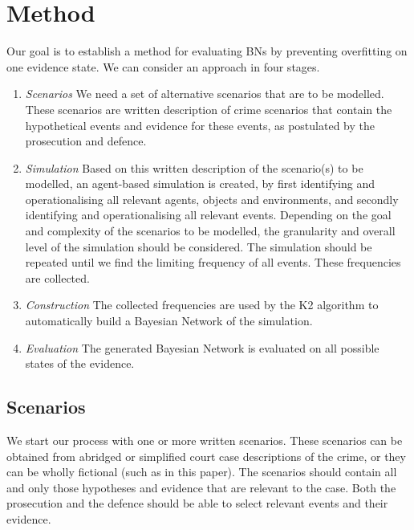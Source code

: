 \documentclass[12pt]{article}
\begin{document}
\newpage

\section{Method}

Our goal is to establish a method for evaluating BNs by preventing overfitting on one evidence state. We can consider an approach in four stages.

\begin{enumerate}
\item \emph{Scenarios} We need a set of alternative scenarios that are to be modelled. These scenarios are written description of crime scenarios that contain the hypothetical events and evidence for these events, as postulated by the prosecution and defence. 

\item  \emph{Simulation} Based on this written description of the scenario(s) to be modelled, an agent-based simulation is created, by first identifying and operationalising all relevant agents, objects and environments, and secondly identifying and operationalising all relevant events. Depending on the goal and complexity of the scenarios to be modelled, the granularity and overall level of the simulation should be considered. The simulation should be repeated until we find the limiting frequency of all events. These frequencies are collected.

\item  \emph{Construction} The collected frequencies are used by the K2 algorithm to automatically build a Bayesian Network of the simulation. 

\item  \emph{Evaluation} The generated Bayesian Network is evaluated on all possible states of the evidence.

\end{enumerate}

\subsection{Scenarios}
We start our process with one or more written scenarios. These scenarios can be obtained from abridged or simplified court case descriptions of the crime, or they can be wholly fictional (such as in this paper). The scenarios should contain all and only those hypotheses and evidence that are relevant to the case. Both the prosecution and the defence should be able to select relevant events and their evidence. 
\end{document}
